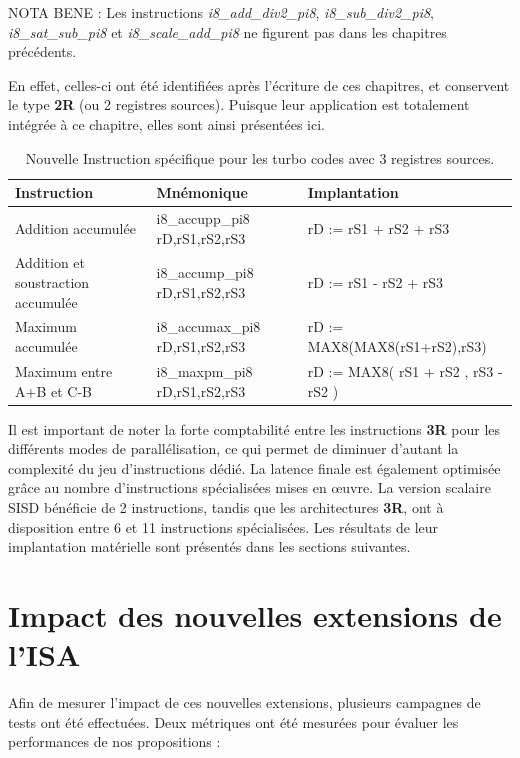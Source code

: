 \documentclass[../main.tex]{subfiles}
\begin{document}
NOTA BENE : Les instructions \textit{i8\_add\_div2\_pi8}, \textit{i8\_sub\_div2\_pi8}, \textit{i8\_sat\_sub\_pi8} et \textit{i8\_scale\_add\_pi8} ne figurent pas dans les chapitres précédents.

En effet, celles-ci ont été identifiées après l'écriture de ces chapitres, et conservent le type \textbf{2R} (ou 2 registres sources).
Puisque leur application est totalement intégrée à ce chapitre, elles sont ainsi présentées ici.
\begin{table}[tb]
    \centering
    \footnotesize
      \begin{tabular}{l || l l }
      \hline
        \textbf{Instruction} & \textbf{Mnémonique}    & \textbf{Implantation} \\ 
        \hline   
        Addition accumulée                  & i8\_accupp\_pi8 rD,rS1,rS2,rS3    & rD := rS1 + rS2 + rS3                \\
        Addition et soustraction accumulée  & i8\_accump\_pi8 rD,rS1,rS2,rS3    & rD := rS1 - rS2 + rS3                \\
        Maximum accumulée                   & i8\_accumax\_pi8 rD,rS1,rS2,rS3   & rD := MAX8(MAX8(rS1+rS2),rS3)      \\
        Maximum entre A+B et C-B            & i8\_maxpm\_pi8 rD,rS1,rS2,rS3     & rD := MAX8( rS1 + rS2 , rS3 - rS2 ) \\
        \hline
      \end{tabular}
    \caption{Nouvelle Instruction spécifique pour les turbo codes avec 3 registres sources.}
    \label{tab:instrus_turbo_3reg}
    \end{table}
Il est important de noter la forte comptabilité entre les instructions \textbf{3R} pour les différents modes de parallélisation, ce qui permet de diminuer d'autant la complexité du jeu d'instructions dédié.
La latence finale est également optimisée grâce au nombre d'instructions spécialisées mises en œuvre.
La version scalaire SISD bénéficie de 2 instructions, tandis que les architectures \textbf{3R}, ont à disposition entre 6 et 11 instructions spécialisées.
Les résultats de leur implantation matérielle sont présentés dans les sections suivantes.
%
%
%
% 
%
\section{Impact des nouvelles extensions de l'ISA}
%
%
%
%
%
Afin de mesurer l'impact de ces nouvelles extensions, plusieurs campagnes de tests ont été effectuées. 
Deux métriques ont été mesurées pour évaluer les performances de nos propositions :
\end{document}

